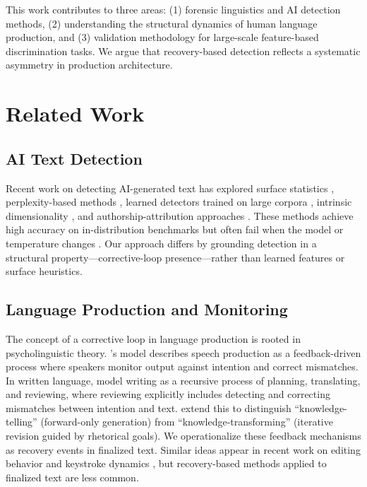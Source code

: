 \documentclass[11pt]{article}
\begin{document}
This work contributes to three areas: (1) forensic linguistics and AI detection methods, (2) understanding the structural dynamics of human language production, and (3) validation methodology for large-scale feature-based discrimination tasks. We argue that recovery-based detection reflects a systematic asymmetry in production architecture.


\section{Related Work}

\subsection{AI Text Detection}

Recent work on detecting AI-generated text has explored surface statistics \citep{solaiman2019release,gehrmann2019gltr,mitchell2023detectgpt}, perplexity-based methods \citep{jauhiainen2023comparing}, learned detectors trained on large corpora \citep{wang2023mfd,sadasivan2024aigenerated,zellers2019defending,bakhtin2019real}, intrinsic dimensionality \citep{tulchinskii2024intrinsic}, and authorship-attribution approaches \citep{uchendu2020authorship}. These methods achieve high accuracy on in-distribution benchmarks but often fail when the model or temperature changes \citep{jiang2024detecting,tan2024llm}. Our approach differs by grounding detection in a structural property---corrective-loop presence---rather than learned features or surface heuristics.

\subsection{Language Production and Monitoring}

The concept of a corrective loop in language production is rooted in psycholinguistic theory. \citeauthor{levelt1989speaking}'s model \citeyearpar{levelt1989speaking} describes speech production as a feedback-driven process where speakers monitor output against intention and correct mismatches. In written language, \citet{flower1981cognitive} model writing as a recursive process of planning, translating, and reviewing, where reviewing explicitly includes detecting and correcting mismatches between intention and text. \citet{bereiter1987psychology} extend this to distinguish ``knowledge-telling'' (forward-only generation) from ``knowledge-transforming'' (iterative revision guided by rhetorical goals). We operationalize these feedback mechanisms as recovery events in finalized text. Similar ideas appear in recent work on editing behavior \citep{schrijvers2016signature} and keystroke dynamics \citep{sap2020recollection}, but recovery-based methods applied to finalized text are less common.
\end{document}
